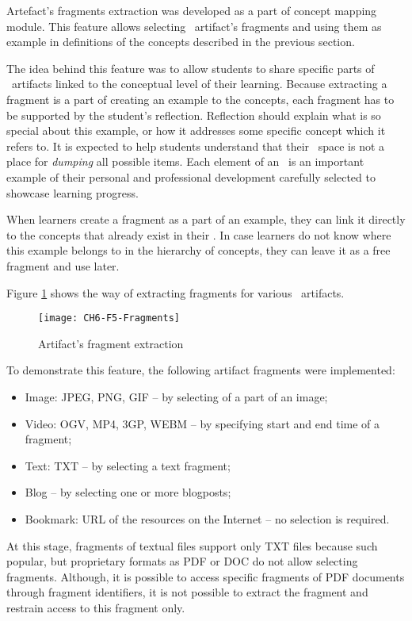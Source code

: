 Artefact's fragments extraction was developed as a part of concept mapping
module. This feature allows selecting \ep~artifact's fragments and using
them as example in definitions of the concepts described in the previous
section.

The idea behind this feature was to allow students to share specific parts of
\ep~artifacts linked to the conceptual level of their learning. Because
extracting a fragment is a part of creating an example to the concepts, each
fragment has to be supported by the student's reflection. Reflection should
explain what is so special about this example, or how it addresses some specific
concept which it refers to. It is expected to help students understand that
their \ep~space is not a place for \textit{dumping} all possible items. Each
element of an \ep~is an important example of their personal and professional
development carefully selected to showcase learning progress.

When learners create a fragment as a part of an example, they can link it
directly to the concepts that already exist in their \ep. In case learners do
not know where this example belongs to in the hierarchy of concepts, they can
leave it as a free fragment and use later.

Figure \ref{fig:frag} shows the way of extracting fragments for various
\ep~artifacts.

\begin{figure}[h!]
\centering
\texttt{[image: CH6-F5-Fragments]}
\caption{Artifact's fragment extraction}
\label{fig:frag}
\end{figure}

To demonstrate this feature, the following artifact fragments were implemented:

\begin{itemize}
  \item Image: JPEG, PNG, GIF -- by selecting of a part of an image;
  \item Video: OGV, MP4, 3GP, WEBM -- by specifying start and end time of a
  fragment;
  \item Text: TXT -- by selecting a text fragment;
  \item Blog -- by selecting one or more blogposts;
  \item Bookmark: URL of the resources on the Internet -- no selection is
  required.
\end{itemize} 

\FloatBarrier

At this stage, fragments of textual files support only TXT files because such
popular, but proprietary formats as PDF or DOC do not allow selecting fragments.
Although, it is possible to access specific fragments of PDF documents through
fragment identifiers, it is not possible to extract the fragment and restrain
access to this fragment only.

